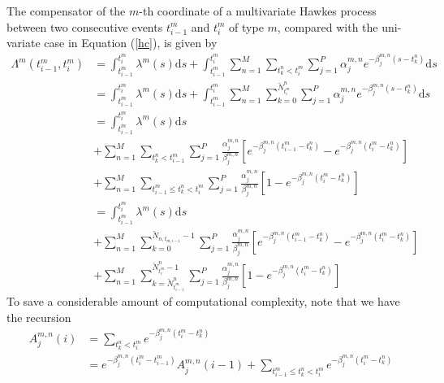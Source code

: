 \documentclass{amsart}
\newcommand{\mathd}{\mathrm{d}}
\begin{document}
The compensator of the $m$-th coordinate of a multivariate Hawkes process
between two consecutive events $t_{i - 1}^m$ and $t_i^m$ of type $m$, compared
with the uni-variate case in Equation (\ref{hc}), is given by
\begin{equation}
  \begin{array}{ll}
    \Lambda^m ( t_{i - 1}^m, t_i^m) & = \int_{t_{i - 1}^m}^{t_i^m} \lambda^m (
    s) \mathd s + \int_{t_{i - 1}^m}^{t_i^m} \sum_{n = 1}^M \sum_{t_k^n <
    t_i^m} \sum_{j = 1}^P \alpha_j^{m, n} e^{- \beta_j^{m, n} ( s - t^n_k)}
    \mathd s\\
    & = \int_{t_{i - 1}^m}^{t_i^m} \lambda^m ( s) \mathd s + \int_{t_{i -
    1}^m}^{t_i^m} \sum_{n = 1}^M \sum_{k = 0}^{\breve{N}^n_{t^m_i}} \sum_{j =
    1}^P \alpha_j^{m, n} e^{- \beta_j^{m, n} ( s - t^n_k)} \mathd s\\
    & = \int_{t_{i - 1}^m}^{t_i^m} \lambda^m ( s) \mathd s\\
    & + \sum_{n = 1}^M \sum_{t_k^n < t_{i - 1}^m} \sum_{j = 1}^P
    \frac{\alpha_j^{m, n}}{\beta_j^{m, n}} [e^{- \beta_j^{m, n} ( t_{i - 1}^m
    - t_k^n)} - e^{- \beta_j^{m, n} ( t_i^m - t_k^n)}]\\
    & + \sum_{n = 1}^M \sum_{t_{i - 1}^m \leqslant t_k^n < t_i^m} \sum_{j =
    1}^P \frac{\alpha_j^{m, n}}{\beta_j^{m, n}} [1 - e^{- \beta_j^{m, n} (
    t_i^m - t_k^n)}]\\
    & = \int_{t_{i - 1}^m}^{t_i^m} \lambda^m ( s) \mathd s\\
    & + \sum_{n = 1}^M \sum_{k = 0}^{\breve{N}^{}_{n, t_{m, i - 1}^{}} - 1}
    \sum_{j = 1}^P \frac{\alpha_j^{m, n}}{\beta_j^{m, n}} [e^{- \beta_j^{m, n}
    ( t_{i - 1}^m - t_k^n)} - e^{- \beta_j^{m, n} ( t_i^m - t_k^n)}]\\
    & + \sum_{n = 1}^M \sum^{\breve{N}^n_{t_i^m} - 1}_{k = \breve{N}^n_{t_{i
    - 1}^m}} \sum_{j = 1}^P \frac{\alpha_j^{m, n}}{\beta_j^{m, n}} [1 - e^{-
    \beta_j^{m, n} ( t_i^m - t_k^n)}]
  \end{array} \label{lhm}
\end{equation}
To save a considerable amount of computational complexity, note that we have
the recursion
\begin{equation}
  \begin{array}{ll}
    A_j^{m, n} ( i) & = \sum_{t_k^n < t_i^m} e^{- \beta_j^{m, n} ( t_i^m -
    t_k^n)}\\
    & = e^{- \beta_j^{m, n} ( t_i^m - t_{i - 1}^m)} A_j^{m, n} ( i - 1) +
    \sum_{t_{i - 1}^m \leqslant t_k^n < t_i^m} e^{- \beta_j^{m, n} ( t_i^m -
    t_k^n)}
  \end{array}
\end{equation}
\end{document}
